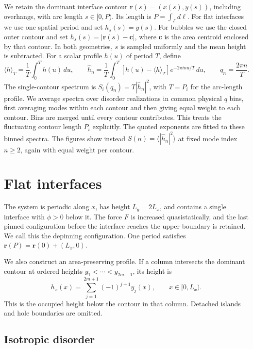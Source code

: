 We retain the dominant interface contour
$\boldsymbol r(s)=(x(s),y(s))$, including overhangs, with arc length
$s\in[0,P)$. Its length is $P=\int_\Gamma d\ell$.
For flat interfaces we use one spatial period and set $h_s(s)=y(s)$.
For bubbles we use the closed outer contour and set
$h_s(s)=|\boldsymbol r(s)-\boldsymbol c|$, where $\boldsymbol c$ is the
area centroid enclosed by that contour.
In both geometries, $s$ is sampled uniformly and the mean height is
subtracted. For a scalar profile $h(u)$ of period $T$, define
\begin{equation}
 \langle h\rangle_T=\frac{1}{T}\int_0^T h(u)\,du,
 \qquad
 \widehat h_n=\frac{1}{T}\int_0^T
 [h(u)-\langle h\rangle_T]e^{-2\pi inu/T}\,du,
 \qquad
 q_n=\frac{2\pi n}{T}.
 \label{eq:height-modes}
\end{equation}
The single-contour spectrum is $S_i(q_n)=T|\widehat h_n|^2$,
with $T=P_i$ for the arc-length profile.
We average spectra over disorder realizations in common physical $q$
bins, first averaging modes within each contour and then giving equal
weight to each contour. Bins are merged until every contour contributes.
This treats the fluctuating contour length $P_i$ explicitly.
The quoted exponents are fitted to these binned spectra.
The figures show instead $S(n)=\langle|\widehat h_n|^2\rangle$ at fixed
mode index $n\geq2$, again with equal weight per contour.

\section{Flat interfaces}
\label{sec:flat}

The system is periodic along $x$, has height $L_y=2L_x$, and contains
a single interface with $\phi>0$ below it. The force $F$ is increased
quasistatically, and the last pinned configuration before the interface
reaches the upper boundary is retained. We call this the depinning configuration.
One period satisfies
$\boldsymbol r(P)=\boldsymbol r(0)+(L_x,0)$.

We also construct an area-preserving profile.
If a column intersects the dominant contour at ordered heights
$y_1<\cdots<y_{2m+1}$, its height is
\begin{equation}
 h_x(x)=\sum_{j=1}^{2m+1}(-1)^{j+1}y_j(x),
 \qquad x\in[0,L_x).
 \label{eq:area-height}
\end{equation}
This is the occupied height below the contour in that column.
Detached islands and hole boundaries are omitted.

\subsection{Isotropic disorder}
\label{sec:flat-isotropic}

